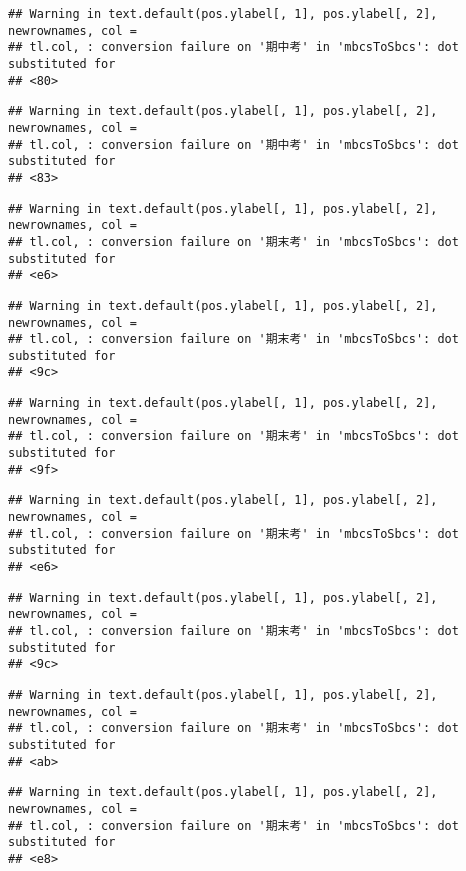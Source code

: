 \documentclass[
]{book}
\begin{document}
\begin{verbatim}
## Warning in text.default(pos.ylabel[, 1], pos.ylabel[, 2], newrownames, col =
## tl.col, : conversion failure on '期中考' in 'mbcsToSbcs': dot substituted for
## <80>
\end{verbatim}

\begin{verbatim}
## Warning in text.default(pos.ylabel[, 1], pos.ylabel[, 2], newrownames, col =
## tl.col, : conversion failure on '期中考' in 'mbcsToSbcs': dot substituted for
## <83>
\end{verbatim}

\begin{verbatim}
## Warning in text.default(pos.ylabel[, 1], pos.ylabel[, 2], newrownames, col =
## tl.col, : conversion failure on '期末考' in 'mbcsToSbcs': dot substituted for
## <e6>
\end{verbatim}

\begin{verbatim}
## Warning in text.default(pos.ylabel[, 1], pos.ylabel[, 2], newrownames, col =
## tl.col, : conversion failure on '期末考' in 'mbcsToSbcs': dot substituted for
## <9c>
\end{verbatim}

\begin{verbatim}
## Warning in text.default(pos.ylabel[, 1], pos.ylabel[, 2], newrownames, col =
## tl.col, : conversion failure on '期末考' in 'mbcsToSbcs': dot substituted for
## <9f>
\end{verbatim}

\begin{verbatim}
## Warning in text.default(pos.ylabel[, 1], pos.ylabel[, 2], newrownames, col =
## tl.col, : conversion failure on '期末考' in 'mbcsToSbcs': dot substituted for
## <e6>
\end{verbatim}

\begin{verbatim}
## Warning in text.default(pos.ylabel[, 1], pos.ylabel[, 2], newrownames, col =
## tl.col, : conversion failure on '期末考' in 'mbcsToSbcs': dot substituted for
## <9c>
\end{verbatim}

\begin{verbatim}
## Warning in text.default(pos.ylabel[, 1], pos.ylabel[, 2], newrownames, col =
## tl.col, : conversion failure on '期末考' in 'mbcsToSbcs': dot substituted for
## <ab>
\end{verbatim}

\begin{verbatim}
## Warning in text.default(pos.ylabel[, 1], pos.ylabel[, 2], newrownames, col =
## tl.col, : conversion failure on '期末考' in 'mbcsToSbcs': dot substituted for
## <e8>
\end{verbatim}
\end{document}
